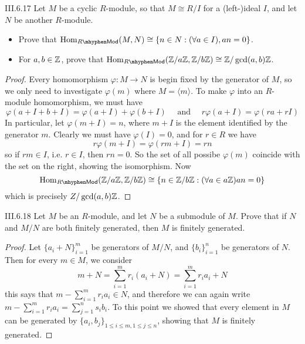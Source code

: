 \begin{problem}{III.6.17}
Let $M$ be a cyclic $R$-module, so that $M \cong R/I$ for a (left-)ideal $I$, and let $N$ be another $R$-module.
\begin{itemize}
    \setlength\itemsep{0pt}
    \item Prove that $\Hom_{R\mhyphen \mathsf{Mod}}(M,N) \cong \{n \in N : (\forall a \in I), an = 0\}$.
    \item For $a, b \in \mathbb{Z}$, prove that $\Hom_{R \mhyphen \mathsf{Mod}}(\Z/a\Z, \Z/b\Z) \cong \Z/\gcd(a,b)\Z$.
\end{itemize}
\end{problem}
\begin{proof}
Every homomorphism $\varphi: M \to N$ is begin fixed by the generator of $M$, so we only need to investigate $\varphi(m)$ where $M = \langle m \rangle$. To make $\varphi$ into an $R$-module homomorphism, we must have
\[
\varphi(a+I+b+I) = \varphi(a+I) + \varphi(b+I) \quad \text{ and } \quad  r\varphi(a+I) = \varphi(ra+rI)	
\]
In particular, let $\varphi(m+I) = n$, where $m+I$ is the element identified by the generator $m$. Clearly we must have $\varphi(I) = 0$, and for $r \in R$ we have
\[
r\varphi(m+I) = \varphi(rm + I) = rn	
\]
so if $rm \in I$, i.e. $r \in I$, then $rn = 0$. So the set of all possibe $\varphi(m)$ coincide with the set on the right, showing the isomorphism. Now
\[
\Hom_{R \mhyphen \mathsf{Mod}}(\Z/a\Z, \Z/b\Z) \cong \{n \in \Z/b\Z : (\forall a \in a\Z) an = 0\}
\]
which is precisely $Z/\gcd(a,b)\mathbb{Z}$.
\end{proof}

\begin{problem}{III.6.18}
Let $M$ be an $R$-module, and let $N$ be a submodule of $M$. Prove that if $N$ and $M/N$ are both finitely generated, then $M$ is finitely generated.
\end{problem}
\begin{proof}
Let $\{a_i + N\}_{i = 1}^m$ be generators of $M/N$, and $\{b_i\}_{i = 1}^n$ be generators of $N$. Then for every $m \in M$, we consider
\[
m + N = \sum_{i=1}^m r_i (a_i + N) = \sum_{i=1}^m r_i a_i + N
\]
this says that $m - \sum_{i=1}^m r_i a_i \in N$, and therefore we can again write $m - \sum_{i=1}^m r_i a_i = \sum_{j=1}^n s_i b_i$. To this point we showed that every element in $M$ can be generated by $\{a_i,b_j\}_{1 \leq i \leq m, 1 \leq j \leq n}$, showing that $M$ is finitely generated.
\end{proof}

\section{}

